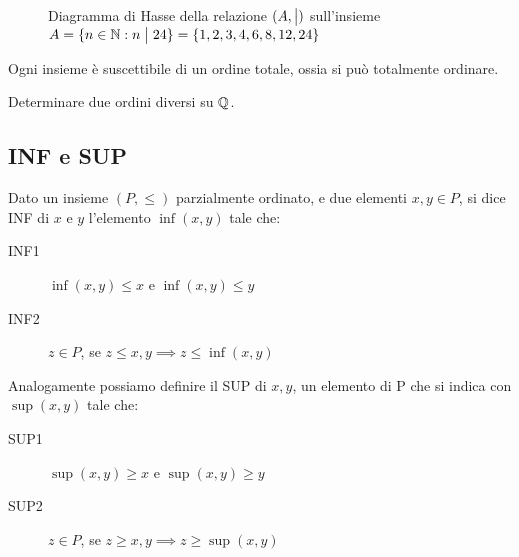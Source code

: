 \begin{figure}[ht]
\centering
{}
\caption{Diagramma di Hasse della relazione $(A,\bigm|)$ sull'insieme $A = \{n \in \mathbb{N} : n \bigm| 24\} = \{ 1, 2, 3, 4, 6, 8, 12, 24 \} $}
\end{figure}

\begin{theorem}
Ogni insieme \`e suscettibile di un ordine totale, ossia si pu\`o totalmente ordinare.
\end{theorem}

\begin{esercizio}
Determinare due ordini diversi su $\mathbb{Q}$.
\end{esercizio}

\subsection{INF e SUP}

\begin{defn}[INF]
Dato un insieme $(P, \leq)$ parzialmente ordinato, e due elementi $x,y \in P$, si dice INF di $x$ e $y$ l'elemento $\inf(x,y)$ tale che:
\begin{description}
    \item[INF1\label{itm:inf1}] $\inf(x,y) \leq x $ e $ \inf(x,y) \leq y$
    \item[INF2\label{itm:inf2}] $z \in P$, se $ z \leq x, y \implies z \leq \inf(x,y)$
\end{description}
\end{defn}
\begin{defn}[SUP]
Analogamente possiamo definire il SUP di $x,y$, un elemento di P che si indica con $\sup(x,y)$ tale che:
\begin{description}
    \item[SUP1\label{itm:sup1}] $\sup(x,y) \geq x $ e $ \sup(x,y) \geq y$
    \item[SUP2\label{itm:sup2}] $z \in P$, se $ z \geq x, y \implies z \geq \sup(x,y)$
\end{description}
\end{defn}

